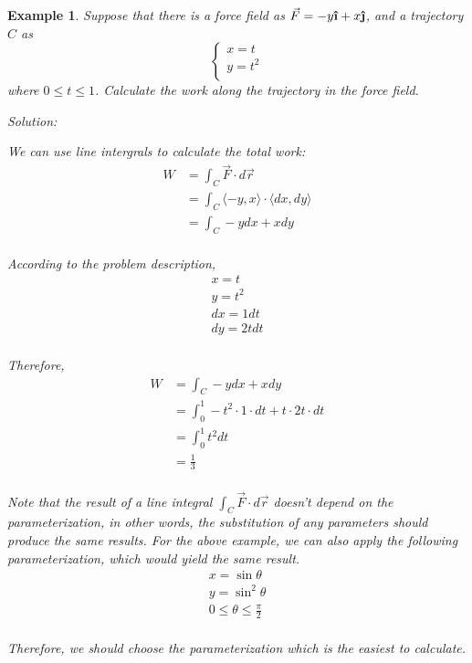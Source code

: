\documentclass{article}
\newtheorem{example}{Example}
\newcommand{\uvec}[1]{\boldsymbol{\hat{\textbf{#1}}}}
\begin{document}
\begin{example}
  Suppose that there is a force field as $\vec{F} = -y \uvec{\i} + x \uvec{\j}$, 
  and a trajectory $C$ as
  \begin{equation*}
    \begin{cases}
      x = t \\
      y = t^2 \\
    \end{cases}
  \end{equation*}
  where $0 \leq t \leq 1$. Calculate the work along the trajectory in the force 
  field.

  Solution:

  We can use line intergrals to calculate the total work:
  \begin{equation*}
    \begin{split}
      W &= \int_C \vec{F} \cdot d\vec{r} \\
        &= \int_C \langle -y, x \rangle \cdot \langle dx, dy \rangle \\
        &= \int_C -ydx + xdy \\
    \end{split}
  \end{equation*}

  According to the problem description,
  \begin{gather*}
    x = t \\
    y = t^2 \\
    dx = 1dt \\
    dy = 2t dt \\
  \end{gather*}

  Therefore,
  \begin{equation*}
    \begin{split}
      W &= \int_C -ydx + xdy \\
        &= \int_0^1 -t^2 \cdot 1 \cdot dt + t \cdot 2t \cdot dt \\
        &= \int_0^1 t^2 dt \\
        &= \frac{1}{3} \\
    \end{split}
  \end{equation*}

  Note that the result of a line integral $\int_C \vec{F} \cdot d\vec{r}$ 
  doesn't depend on the parameterization, in other words, the substitution of 
  any parameters should produce the same results. For the above example, we can 
  also apply the following parameterization, which would yield the same result.
  \begin{gather*}
    x = \sin\theta \\
    y = \sin^2 \theta \\
    0 \leq \theta \leq \frac{\pi}{2} \\
  \end{gather*}

  Therefore, we should choose the parameterization which is the easiest to 
  calculate.
\end{example}
\end{document}
